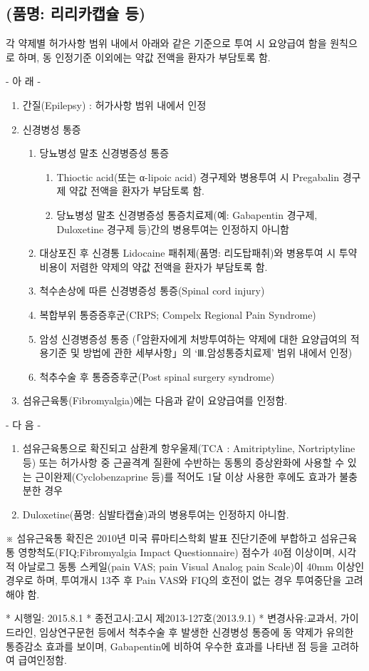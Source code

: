 \subsection{\label{PregabalinOral}(품명: 리리카캡슐 등)}
각 약제별 허가사항 범위 내에서 아래와 같은 기준으로 투여 시 요양급여 함을 원칙으로 하며, 동 인정기준 이외에는 약값 전액을 환자가 부담토록 함. \par
- 아 래 -
\begin{enumerate}[가.]\tightlist
\item 간질(Epilepsy) : 허가사항 범위 내에서 인정
\item 신경병성 통증
	\begin{enumerate}[1)]\tightlist
	\item  당뇨병성 말초 신경병증성 통증 
		\begin{enumerate}[가)]\tightlist
		\item Thioctic acid(또는 α-lipoic acid) 경구제와 병용투여 시 Pregabalin 경구제 약값 전액을 환자가 부담토록 함. 
		\item 당뇨병성 말초 신경병증성 통증치료제(예: Gabapentin 경구제, Duloxetine 경구제 등)간의 병용투여는 인정하지 아니함
		\end{enumerate}
	\item 대상포진 후 신경통 Lidocaine 패취제(품명: 리도탑패취)와 병용투여 시 투약비용이 저렴한 약제의 약값 전액을 환자가 부담토록 함.
	\item 척수손상에 따른 신경병증성 통증(Spinal cord injury)
	\item 복합부위 통증증후군(CRPS; Compelx Regional Pain Syndrome)
	\item 암성 신경병증성 통증 (「암환자에게 처방투여하는 약제에 대한 요양급여의 적용기준 및 방법에 관한 세부사항」의 ‘Ⅲ.암성통증치료제’ 범위 내에서 인정)
	\item 척추수술 후 통증증후군(Post spinal surgery syndrome)
	\end{enumerate}
\item 섬유근육통(Fibromyalgia)에는 다음과 같이 요양급여를 인정함.
\end{enumerate}
- 다 음 -
\begin{enumerate}[1)]\tightlist
\item 섬유근육통으로 확진되고 삼환계 항우울제(TCA : Amitriptyline, Nortriptyline 등) 또는 허가사항 중 근골격계 질환에 수반하는 동통의 증상완화에 사용할 수 있는 근이완제(Cyclobenzaprine 등)를 적어도 1달 이상 사용한 후에도 효과가 불충분한 경우
\item Duloxetine(품명: 심발타캡슐)과의 병용투여는 인정하지 아니함.
\end{enumerate}
※ 섬유근육통 확진은 2010년 미국 류마티스학회 발표 진단기준에 부합하고 섬유근육통 영향척도(FIQ;Fibromyalgia Impact Questionnaire) 점수가 40점 이상이며, 시각적 아날로그 동통 스케일(pain VAS; pain Visual Analog pain Scale)이 40mm 이상인 경우로 하며, 투여개시 13주 후 Pain VAS와 FIQ의 호전이 없는 경우 투여중단을 고려해야 함.\par
* 시행일: 2015.8.1
* 종전고시:고시 제2013-127호(2013.9.1)
* 변경사유:교과서, 가이드라인, 임상연구문헌 등에서 척추수술 후 발생한 신경병성 통증에 동 약제가 유의한 통증감소 효과를 보이며, Gabapentin에 비하여 우수한 효과를 나타낸 점 등을 고려하여 급여인정함. 
  
